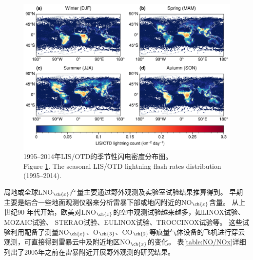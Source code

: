 \begin{figure}[H]
\centering
\includegraphics[width=\textwidth]{./figures/lisotd_season.png}
\caption{1995--2014年LIS/OTD的季节性闪电密度分布图。\\
Figure \ref{fig:lisotd_season}. The seasonal LIS/OTD lightning flash rates distribution (1995--2014).
}
\label{fig:lisotd_season}
\end{figure}

局地或全球LNO$_{\ch{x}}$产量主要通过野外观测及实验室试验结果推算得到。
早期主要是结合一些地面观测仪器来分析雷暴下部或地闪附近的NO$_{\ch{x}}$含量。
从上世纪90 年代开始，欧美对LNO$_{\ch{x}}$的空中观测试验越来越多，如LINOX试验\citep{Huntrieser.1998}、 MOZAIC试验\citep{Marenco.1998}、
STERAO试验\citep{Dye.2000}、EULINOX试验\citep{Holler.2000}、TROCCINOX试验\citep{Huntrieser.2007}等。
这些试验利用配备了测量NO$_{\ch{x}}$、O$_{\ch{3}}$、CO$_{\ch{2}}$等痕量气体设备的飞机进行穿云观测，可直接得到雷暴云中及附近地区NO$_{\ch{x}}$的变化。
表\ref{table:NO/NOx}详细列出了2005年之前在雷暴附近开展野外观测的研究结果。

